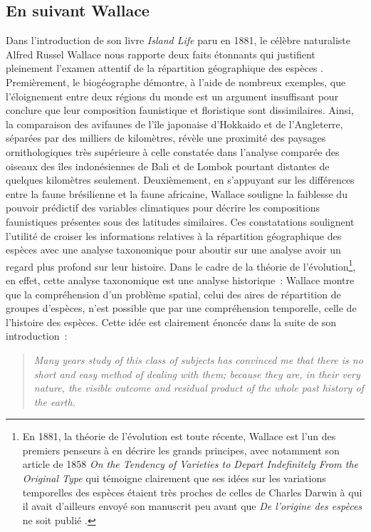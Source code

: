 \subsection*{En suivant Wallace}\label{en-suivant-wallace}

Dans l'introduction de son livre \emph{Island Life} paru en 1881, le
célèbre naturaliste Alfred Russel Wallace nous rapporte deux faits
étonnants qui justifient pleinement l'examen attentif de la répartition
géographique des espèces \citep{wallace1881island}. Premièrement, le
biogéographe démontre, à l'aide de nombreux exemples, que l'éloignement
entre deux régions du monde est un argument insuffisant pour conclure
que leur composition faunistique et floristique sont dissimilaires.
Ainsi, la comparaison des avifaunes de l'île japonaise d'Hokkaido et de
l'Angleterre, séparées par des milliers de kilomètres, révèle une
proximité des paysages ornithologiques très supérieure à celle constatée
dans l'analyse comparée des oiseaux des îles indonésiennes de Bali et de
Lombok pourtant distantes de quelques kilomètres seulement.
Deuxièmement, en s'appuyant sur les différences entre la faune
brésilienne et la faune africaine, Wallace souligne la faiblesse du
pouvoir prédictif des variables climatiques pour décrire les
compositions faunistiques présentes sous des latitudes similaires. Ces
constatations soulignent l'utilité de croiser les informations relatives
à la répartition géographique des espèces avec une analyse taxonomique
pour aboutir sur une analyse avoir un regard plus profond sur leur
histoire. Dans le cadre de la théorie de l'évolution\footnote{En 1881,
  la théorie de l'évolution est toute récente, Wallace est l'un des
  premiers penseurs à en décrire les grands principes, avec notamment
  son article de 1858 \emph{On the Tendency of Varieties to Depart
  Indefinitely From the Original Type} qui témoigne clairement que ses
  idées sur les variations temporelles des espèces étaient très proches
  de celles de Charles Darwin à qui il avait d'ailleurs envoyé son
  manuscrit peu avant que \emph{De l'origine des espèces} ne soit publié
  \citep{Wallace1858}.}, en effet, cette analyse taxonomique est une
analyse historique~: Wallace montre que la compréhension d'un problème
spatial, celui des aires de répartition de groupes d'espèces, n'est
possible que par une compréhension temporelle, celle de l'histoire des
espèces. Cette idée est clairement énoncée dans la suite de son
introduction~:

\begin{quote}
\emph{Many years study of this class of subjects has convinced me that
there is no short and easy method of dealing with them; because they
are, in their very nature, the visible outcome and residual product of
the whole past history of the earth.}
\end{quote}

